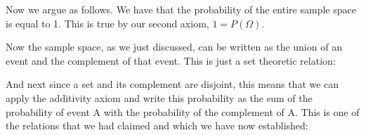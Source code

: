 \documentclass[pdftex, brazil, 12pt, twoside]{article}
\begin{document}
\begin{figure}[H]
  \begin{center}
  \end{center}
\end{figure}

Now we argue as follows.
We have that the probability of the entire sample space is
equal to 1.
This is true by our second axiom, $1 = P(\Omega)$.

\begin{figure}[H]
  \begin{center}
  \end{center}
\end{figure}

Now the sample space, as we just discussed, can be written
as the union of an event and the complement of that event.
This is just a set theoretic relation:

\begin{figure}[H]
  \begin{center}
  \end{center}
\end{figure}

And next since a set and its complement are disjoint, this
means that we can apply the additivity axiom and write
this probability as the sum of the probability of event A
with the probability of the complement of A. This is one
of the relations that we had claimed and which we have now
established:
\end{document}
